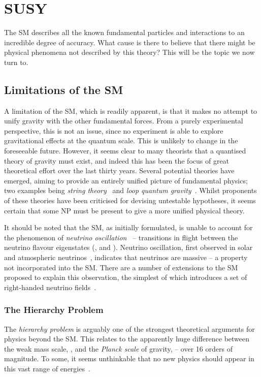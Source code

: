 \chapter{\acl{SUSY}}
\label{sec:susy}
The \ac{SM} describes all the known fundamental particles and interactions to an
incredible degree of accuracy. What cause is there to believe that there might
be physical phenomena not described by this theory? This will be the topic we
now turn to.

\section{Limitations of the \acl{SM}}
\label{sec:susy_limitations_sm}
A limitation of the \ac{SM}, which is readily apparent, is that it makes no
attempt to unify gravity with the other fundamental forces. From a purely
experimental perspective, this is not an issue, since no experiment is able to
explore gravitational effects at the quantum scale. This is unlikely to change
in the foreseeable future. However, it seems clear to many theorists that a
quantised theory of gravity must exist, and indeed this has been the focus of
great theoretical effort over the last thirty years. Several potential theories
have emerged, aiming to provide an entirely unified picture of fundamental
physics; two examples being \emph{string theory}~\cite{string_theory} and
\emph{loop quantum gravity}~\cite{loop_quantum}. Whilst proponents of these
theories have been criticised for devising untestable hypotheses, it seems
certain that some \ac{NP} must be present to give a more unified physical
theory.

It should be noted that the \ac{SM}, as initially formulated, is unable to
account for the phenomenon of \emph{neutrino oscillation}~\cite{pdg} --
transitions in flight between the neutrino flavour eigenstates (\Pnue, \Pnum and
\Pnut). Neutrino oscillation, first observed in solar and atmospheric
neutrinos~\cite{neutrino_osc,neutrino_osc_discovery}, indicates that neutrinos
are massive -- a property not incorporated into the \ac{SM}. There are a number
of extensions to the \ac{SM} proposed to explain this observation, the simplest
of which introduces a set of right-handed neutrino fields~\cite{pdg}.

\subsection{The Hierarchy Problem}
The \emph{hierarchy problem} is arguably one of the strongest theoretical
arguments for physics beyond the \ac{SM}. This relates to the apparently huge
difference between the weak mass scale, \Mweak, and the \emph{Planck scale} of
gravity, \Mplanck -- over 16 orders of magnitude. To some, it seems unthinkable
that no new physics should appear in this vast range of
energies~\cite{susy_primer}.


